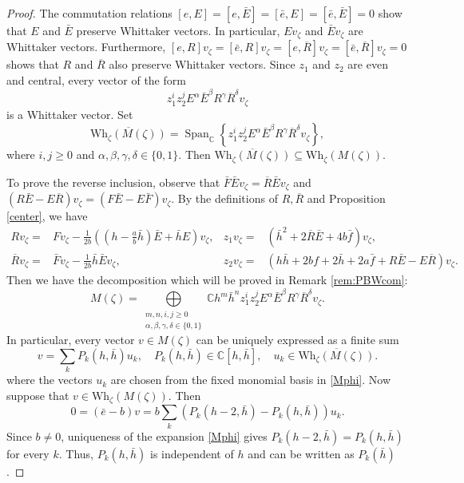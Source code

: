 \documentclass[a4paper,10pt]{article}
\theoremstyle{definition}
\theoremstyle{plain}
\theoremstyle{remark}
\theoremstyle{mystyle}
\numberwithin{equation}{section}
\begin{document}
\begin{proof}
    The commutation relations $[e,E]=[e,\bar E]=[\bar e,E]=[\bar e,\bar E]=0$ show that \(E\) and \(\bar E\) preserve Whittaker vectors. In particular, \(Ev_{\zeta}\) and \(\bar Ev_{\zeta}\) are Whittaker vectors. Furthermore, $[e,R]v_{\zeta}=[\bar e,R]v_{\zeta}=[e,\overline{R}]v_{\zeta}=[\bar e,\overline{R}]v_{\zeta}=0$ shows that \(R\) and \(\overline{R}\) also preserve Whittaker vectors. Since \(z_1\) and \(z_2\) are even and central, every vector of the form
    $$
    z_1^{i}z_2^{j}E^{\alpha }\bar E^{\beta }R^{\gamma}\overline{R}^{\delta}v_{\zeta}
    $$
    is a Whittaker vector. 
    Set
    \[
        \overline {\mathrm{Wh}_{\zeta}(M(\zeta))}=\operatorname{Span}_{\mathbb C}\left\{z_1^iz_2^jE^\alpha\bar E^\beta R^\gamma\overline{R}^\delta v_{\zeta}\right\},
    \]
    where \(i,j\geq0\) and \(\alpha,\beta,\gamma,\delta\in\{0,1\}\). Then $\overline{\mathrm{Wh}_{\zeta}(M(\zeta))} \subseteq \mathrm {Wh}_{\zeta}(M(\zeta))$. 
    
    To prove the reverse inclusion, observe that $\bar F\bar Ev_{\zeta}=\overline{R}\bar Ev_{\zeta}$ and $(R\bar E-E\overline{R})v_{\zeta}=(F\bar E-E\bar F)v_{\zeta}$. By the definitions of $R,\overline{R}$ and Proposition \ref{center}, we have 
    \begin{align}
    Rv_{\zeta} =& Fv_{\zeta}-\frac{1}{2b}\left( (h-\frac{a}{b}\bar{h})\bar{E}+\bar{h}E \right)v_{\zeta}, &  z_1v_{\zeta} =& (\bar{h}^2+2\overline{R}\bar{E}+4b\bar{f})v_{\zeta}, \label{R} \\[1ex]
    \overline{R}v_{\zeta} =& \bar{F}v_{\zeta}-\frac{1}{2b}\bar{h}\bar{E}v_{\zeta},
    &z_2v_{\zeta} =& (h\bar{h}+2bf+2\bar{h}+2a\bar{f}+R\bar{E}-E\overline{R})v_{\zeta}. \label{fc}
    \end{align}
    Then we have the decomposition which will be proved in Remark \ref{rem:PBWcom}:
    \begin{equation}\label{Mphi}
    M(\zeta)=\bigoplus\limits_{\substack{m,n,i,j\geq 0\\\alpha ,\beta ,\gamma,\delta\in \{0,1\}}}\mathbb Ch^m\bar h^nz_1^iz_2^jE^{\alpha}\bar E^{\beta}R^{\gamma}\overline{R}^{\delta}v_{\zeta}.    
    \end{equation}
    In particular, every vector $v\in M(\zeta)$ can be uniquely expressed as a finite sum
    $$
    v=\sum_{k}P_k(h,\bar h)u_k,\quad P_k(h,\bar h)\in \mathbb C[h,\bar h],\quad u_k\in \overline{\mathrm{Wh}_{\zeta}(M(\zeta))}.
    $$
    where the vectors $u_k$ are chosen from the fixed monomial basis in \eqref{Mphi}. Now suppose that $v\in \mathrm{Wh}_{\zeta}(M(\zeta))$. Then
    $$
    0=(\bar e-b)v=b\sum_{k}(P_k(h-2,\bar h)-P_k(h,\bar h))u_k.
    $$
    Since $b\neq 0$, uniqueness of the expansion \eqref{Mphi} gives $P_{k}(h-2,\bar h)=P_k(h,\bar h)$ for every $k$. Thus, \(P_k(h,\bar h)\) is independent of \(h\) and can be written as $P_k(\bar h)$.
    

\end{proof}
\end{document}
